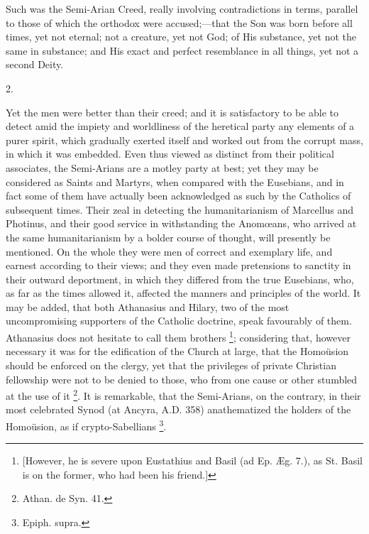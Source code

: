 Such was the Semi-Arian Creed, really involving contradictions in
terms, parallel to those of which the orthodox were accused;—that
the Son was born before all times, yet not eternal; not a creature,
yet not God; of His substance, yet not the same in substance; and His
exact and perfect resemblance in all things, yet not a second Deity.

2.

Yet the men were better than their creed; and it is satisfactory to
be able to detect amid the impiety and worldliness of the heretical
party any elements of a purer spirit, which gradually exerted itself
and worked out from the corrupt mass, in which it was embedded. Even
thus viewed as distinct from their political associates, the
Semi-Arians are a motley party at best; yet they may be considered as
Saints and Martyrs, when compared with the Eusebians, and in fact some
of them have actually been acknowledged as such by the Catholics of
subsequent times. Their zeal in detecting the humanitarianism of
Marcellus and Photinus, and their good service in withstanding the
Anomœans, who arrived at the same humanitarianism by a bolder
course of thought, will presently be mentioned. On the whole they were
men of correct and exemplary life, and earnest according to their
views; and they even made pretensions to sanctity in their outward
deportment, in which they differed from the true Eusebians, who, as
far as the times allowed it, affected the manners and principles of
the world. It may be added, that both Athanasius and Hilary, two of
the most uncompromising supporters of the Catholic doctrine, speak
favourably of them. Athanasius does not hesitate to call them brothers
\footnote{[However, he is severe upon Eustathius and
Basil (ad Ep. Æg. 7.), as St. Basil is on the former, who had been
his friend.]}; considering that,
however necessary it was for the edification of the Church at large,
that the Homoüsion should be enforced on the clergy, yet that the
privileges of private Christian fellowship were not to be denied to
those, who from one cause or other stumbled at the use of it \footnote{Athan. de Syn. 41.}. It is remarkable, that the Semi-Arians, on the contrary, in
their most celebrated Synod (at Ancyra, A.D.
358) anathematized the holders of the Homoüsion, as if crypto-Sabellians
\footnote{Epiph. supra.}.


